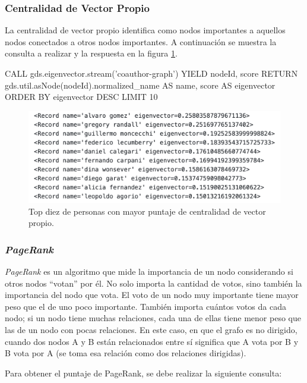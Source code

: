 \documentclass[journal]{IEEEtran}
\begin{document}
\subsubsection{Centralidad de Vector Propio}
La centralidad de vector propio identifica como nodos importantes a aquellos nodos conectados a otros nodos importantes. A continuación se muestra la consulta a realizar y la respuesta en la figura \ref{fig:vector_propio}.
\begin{sflisting}[style=sparql,caption= Centralidad de Vector Propio,label=eigenvector]
	CALL gds.eigenvector.stream('coauthor-graph')
	YIELD nodeId, score
	RETURN gds.util.asNode(nodeId).normalized_name
	AS name, score AS eigenvector
	ORDER BY eigenvector DESC
	LIMIT 10
\end{sflisting}

\begin{figure}[t]
	\centering
	\includegraphics[width=\linewidth]{imagenes/eigenvector.png}
	\caption{Top diez de personas con mayor puntaje de centralidad de vector propio.}
	\label{fig:vector_propio}
\end{figure}

\subsubsection{\textit{PageRank}}
\textit{PageRank} es un algoritmo que mide la importancia de un nodo considerando si otros nodos ``votan'' por él. No solo importa la cantidad de votos, sino también la importancia del nodo que vota. El voto de un nodo muy importante tiene mayor peso que el de uno poco importante. También importa cuántos votos da cada nodo; si un nodo tiene muchas relaciones, cada una de ellas tiene menor peso que las de un nodo con pocas relaciones. En este caso, en que el grafo es no dirigido, cuando dos nodos A y B están relacionados entre sí significa que A vota por B y B vota por A (se toma esa relación como dos relaciones dirigidas).

Para obtener el puntaje de PageRank, se debe realizar la siguiente consulta:
\end{document}
